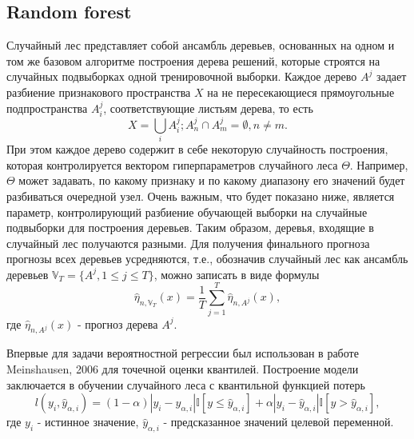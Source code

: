 \documentclass[fleqn,usenatbib]{mnras}
\begin{document}
\subsection{Random forest}

Случайный лес \cite{bib:forests_brieman} представляет собой ансамбль деревьев, основанных на одном и том же базовом алгоритме построения дерева решений, которые строятся на случайных подвыборках одной тренировочной выборки. Каждое дерево \(A^j\) задает разбиение признакового пространства \(X\) на не пересекающиеся прямоугольные подпространства \(A^j_i\), соответствующие листьям дерева, то есть
\begin{equation}
    X = \bigcup_i {A^j_i}; A^j_n \cap A^j_m = \emptyset, n \neq m.
\end{equation}
При этом каждое дерево содержит в себе некоторую случайность построения, которая контролируется вектором гиперпараметров случайного леса \(\Theta\). Например, \(\Theta\) может задавать, по какому признаку и по какому диапазону его значений будет разбиваться очередной узел. Очень важным, что будет показано ниже, является параметр, контролирующий разбиение обучающей выборки на случайные подвыборки для построения деревьев. Таким образом, деревья, входящие в случайный лес получаются разными. Для получения финального прогноза прогнозы всех деревьев усредняются, т.е., обозначив случайный лес как ансамбль деревьев \(\mathbb{V}_T = \{A^j, 1 \leq j \leq T\}\), можно записать в виде формулы
\begin{equation}
    \hat{\eta}_{n, \mathbb{V}_T}(x) = \frac{1}{T} \sum_{j=1}^T \hat\eta_{n, A^j}(x),
\end{equation}
где \(\hat\eta_{n, A^j}(x)\) - прогноз дерева \(A^j\).

Впервые для задачи вероятностной регрессии был использован в работе Meinshausen, 2006 \cite{bib:forests_meinshausen} для точечной оценки квантилей. Построение модели заключается в обучении случайного леса с квантильной функцией потерь 
\begin{equation}
    l(y_i, \hat{y}_{\alpha, i}) = (1-\alpha)|y_i - \hat{y}_{\alpha, i}|\mathbb{I}[y \leq \hat{y}_{\alpha, i}] + \alpha|y_i - \hat{y}_{\alpha, i}|\mathbb{I}[y > \hat{y}_{\alpha, i}],
\end{equation}
где \(y_i\) - истинное значение, \(\hat{y}_{\alpha, i}\) - предсказанное значений целевой переменной.
\end{document}
